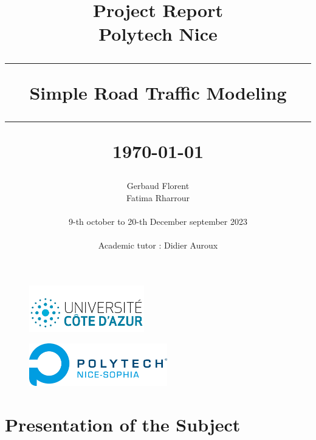 \documentclass{article}
\title{\textbf{\Huge Project Report}\\[1cm]
	\textbf{\LARGE Polytech Nice}\\[2cm]
	\hrule height 1pt
	\vspace{0.5cm}
	\textbf{\Large Simple Road Traffic Modeling}\\[0.5cm]
	\hrule height 1pt
	\vspace{3cm}
	\small{\today{}}}
\author{
	\begin{tabular}{c}
		Gerbaud Florent \\ Fatima Rharrour \\ \\
		9-th october to 20-th December september 2023\\
		\\ Academic tutor : Didier Auroux
	\end{tabular}
}
\date{}
\begin{document}
	\maketitle
	\hspace{2cm}
	\begin{figure}[b]
		\centering
		\begin{minipage}[b]{0.45\linewidth}
			\includegraphics[width=5cm]{logo.png} \\
		\end{minipage}
		\hfill
		\begin{minipage}[b]{0.45\linewidth}
			\raggedleft
			\vspace{-0.5cm}
			\includegraphics[width=6cm]{Polytech.png} \\
		\end{minipage}
	\end{figure}
	\newpage %
	\renewcommand{\contentsname}{
		\hfill
		\begin{tikzpicture}
			\node[draw, fill=white, inner sep=20pt,line width=1.5pt] {\fontsize{30}{36}\selectfont\bfseries Table of Contents};
		\end{tikzpicture}
		\hfill
	}
	\tableofcontents
	\newpage
	\listoffigures %
	
	\listofalgorithms
	\newpage
	\section{Presentation of the Subject}
\end{document}
